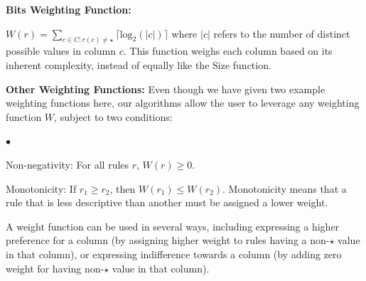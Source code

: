 \documentclass[10pt,journal,compsoc]{IEEEtran}
\newcommand{\squishlist}{
   \begin{list}{$\bullet$}
    { \setlength{\itemsep}{0pt}
      \setlength{\parsep}{2pt}
      \setlength{\topsep}{2pt}
      \setlength{\partopsep}{0pt}
    }
}
\newcommand{\stitle}[1]{\vspace{0.5em}\noindent\textbf{#1}}
\newcommand{\squishend}{\end{list}}
\newcommand{\eat}[1]{}
\newcommand{\papertext}[1]{#1}
\begin{document}
\stitle{Bits Weighting Function:}

$W(r) = \sum_{c \in C : r(c) \neq \star} \lceil \text{log}_2(|c|) \rceil$ where $|c|$ refers to the number of distinct possible values in column $c$. This function weighs each column based on its inherent complexity, instead of equally like the Size function.

\smallskip

\stitle{Other Weighting Functions:}
Even though we have given two example weighting functions here, our algorithms allow the user to leverage any weighting function $W$, subject to two conditions:
\squishlist
\item Non-negativity: For all rules $r$, $W(r) \geq 0$.
\item Monotonicity: If $r_1 \geq r_2$, then $W(r_1) \leq W(r_2)$. Monotonicity means that a rule that is less descriptive than another must be assigned a lower weight.
\squishend
A weight function can be used in several ways, including expressing a higher preference for a column (by assigning higher weight to rules having a non-$\star$ value in that column), or expressing indifference towards a column (by adding zero weight for having non-$\star$ value in that column).
\end{document}
